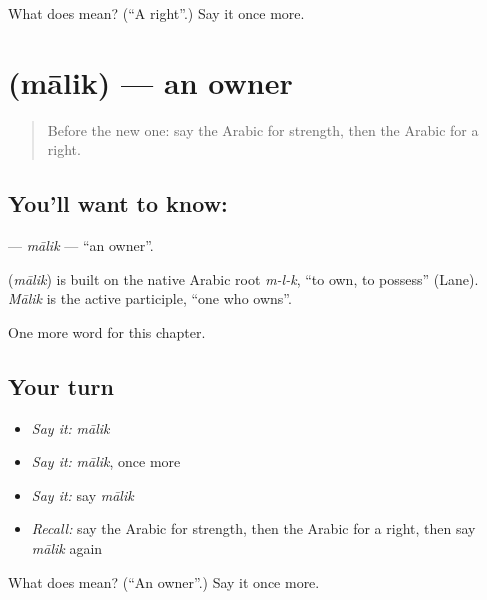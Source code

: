 \begin{tcolorbox}[breakable,colback=teal!4,colframe=teal!35!black,title={Before you move on}]
What does  mean? (\textquotedblleft{}A right\textquotedblright{}.) Say it once more.
\end{tcolorbox}
\section[\texorpdfstring{\ar{مالك} (mālik)}{مالك (mālik)}]{ (mālik) — an owner}

\label{lesson:AR-C108-malik}



\begin{quote}
Before the new one: say the Arabic for strength, then the Arabic for a right.
\end{quote}

\subsection*{You'll want to know: }
\textbf{} — \emph{mālik} — \textquotedblleft{}an owner\textquotedblright{}.

\begin{cousinweb}
\textbf{} (\emph{mālik}) is built on the native Arabic root \emph{m-l-k}, \textquotedblleft{}to own, to possess\textquotedblright{} (Lane). \emph{Mālik} is the active participle, \textquotedblleft{}one who owns\textquotedblright{}.
\end{cousinweb}

\begin{grammarlens}[title={What you've built}]
One more word for this chapter.
\end{grammarlens}

\subsection*{Your turn}
\begin{itemize}
\raggedright
  \item \emph{Say it:} \emph{mālik}
  \item \emph{Say it:} \emph{mālik}, once more
  \item \emph{Say it:} say \emph{mālik}
  \item \emph{Recall:} say the Arabic for strength, then the Arabic for a right, then say \emph{mālik} again
\end{itemize}

\begin{tcolorbox}[breakable,colback=teal!4,colframe=teal!35!black,title={Before you move on}]
What does  mean? (\textquotedblleft{}An owner\textquotedblright{}.) Say it once more.
\end{tcolorbox}
